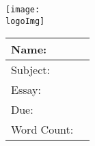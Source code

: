 \begin{center}
	\texttt{[image: \\logoImg]}
	
	\vspace{.5cm}
	\def\arraystretch{1.3}
	\begin{tabular}{ m{} | m{} }
		\toprule
		Name: & \myName  \\
		\midrule
		Subject: & \mySubject \\
		\midrule
		Essay: & \essayTitle \\
		\midrule
		Due: & \dueDate \\
		\midrule
		Word Count: &  \wordCount \\ 	
		\bottomrule
	\end{tabular}
	\vspace{.5cm}
\end{center}

